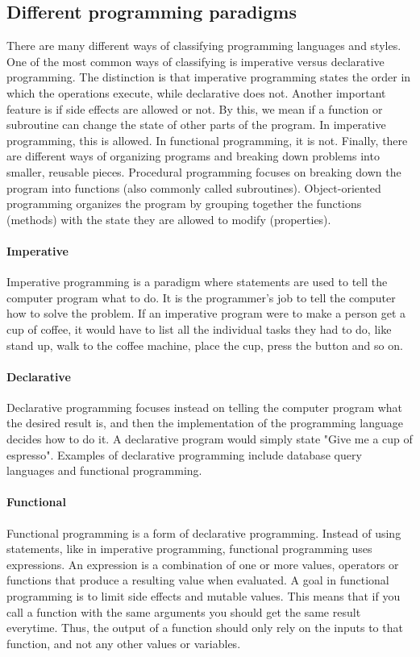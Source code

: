 \documentclass[12pt, a4paper]{article}
\begin{document}
\newpage

\subsection{Different programming paradigms}
There are many different ways of classifying programming languages and styles. One of the most common ways of classifying is imperative versus declarative programming. The distinction is that imperative programming states the order in which the operations execute, while declarative does not. Another important feature is if side effects are allowed or not. By this, we mean if a function or subroutine can change the state of other parts of the program. In imperative programming, this is allowed. In functional programming, it is not. Finally, there are different ways of organizing programs and breaking down problems into smaller, reusable pieces. Procedural programming focuses on breaking down the program into functions (also commonly called subroutines). Object-oriented programming organizes the program by grouping together the functions (methods) with the state they are allowed to modify (properties).

\paragraph{Imperative} Imperative programming is a paradigm where statements are used to tell the computer program what to do. It is the programmer’s job to tell the computer how to solve the problem. If an imperative program were to make a person get a cup of coffee, it would have to list all the individual tasks they had to do, like stand up, walk to the coffee machine, place the cup, press the button and so on. 

\paragraph{Declarative} Declarative programming focuses instead on telling the computer program what the desired result is, and then the implementation of the programming language decides how to do it. A declarative program would simply state "Give me a cup of espresso". Examples of declarative programming include database query languages and functional programming.

\paragraph{Functional} Functional programming is a form of declarative programming. Instead of using statements, like in imperative programming, functional programming uses expressions. An expression is a combination of one or more values, operators or functions that produce a resulting value when evaluated. A goal in functional programming is to limit side effects and mutable values. This means that if you call a function with the same arguments you should get the same result everytime. Thus, the output of a function should only rely on the inputs to that function, and not any other values or variables.
\end{document}
